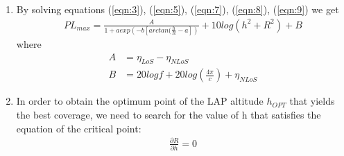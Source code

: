\documentclass{beamer}
\begin{document}
\begin{frame}{}
   \begin{enumerate}
       \item By solving equations (\ref{eqn:3}), (\ref{eqn:5}), (\ref{eqn:7}), (\ref{eqn:8}), (\ref{eqn:9})  we get 
       \begin{align}
           PL_{max} = \frac{A}{1+a exp\left(-b\left[ arctan(\frac{h}{R} - a\right] \right)} + 10 log(h^2 + R^2) + B
           \label{eqn:10}
       \end{align}
       where \begin{align*}
               A &= \eta_{LoS} - \eta_{NLoS} \\
               B &= 20log f + 20 log(\frac{4 \pi}{c}) +   \eta_{NLoS}
           \end{align*}
           \item In order to obtain the optimum point of the LAP altitude $h_{OPT}$ that yields the best coverage, we need to search for the value of h that satisfies the equation of the critical point:
           \begin{align}
               \frac{\partial R}{\partial h} = 0
           \end{align}
     
   \end{enumerate}
\end{frame}
\end{document}
